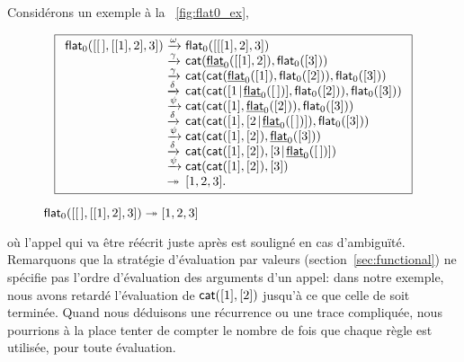 Considérons un exemple à la \fig~\vref{fig:flat0_ex},
\begin{figure}[!b]
\begin{equation*}
\boxed{%
\begin{array}{r@{\;}l@{\;}l}
\fun{flat}_0([\el,[[1],2],3])
& \xrightarrow{\smash{\omega}}
& \fun{flat}_0([[[1],2],3])\\
& \xrightarrow{\smash{\gamma}}
& \fun{cat}(\ufun{flat}_0([[1],2]),\fun{flat}_0([3]))\\
& \xrightarrow{\smash{\gamma}}
& \fun{cat}(\fun{cat}(\ufun{flat}_0([1]),\fun{flat}_0([2])),\fun{flat}_0([3]))\\
& \xrightarrow{\smash{\delta}}
& \fun{cat}(\fun{cat}(\cons{1}{\ufun{flat}_0(\el)},\fun{flat}_0([2])),\fun{flat}_0([3]))\\
& \xrightarrow{\smash{\psi}}
& \fun{cat}(\fun{cat}([1],\ufun{flat}_0([2])),\fun{flat}_0([3]))\\
& \xrightarrow{\smash{\delta}}
& \fun{cat}(\fun{cat}([1],\cons{2}{\ufun{flat}_0(\el)}),\fun{flat}_0([3]))\\
& \xrightarrow{\smash{\psi}}
& \fun{cat}(\fun{cat}([1],[2]),\ufun{flat}_0([3]))\\
& \xrightarrow{\smash{\delta}}
& \fun{cat}(\fun{cat}([1],[2]),\cons{3}{\ufun{flat}_0(\el)})\\
& \xrightarrow{\smash{\psi}}
& \fun{cat}(\fun{cat}([1],[2]),[3])\\
& \twoheadrightarrow & [1,2,3].
\end{array}
}
\end{equation*}
\caption{\(\textsf{flat}_0([[\,],[[1],2],3]) \twoheadrightarrow [1,2,3]\)}
\label{fig:flat0_ex}
\end{figure}
où l'appel qui va être réécrit juste après est souligné en cas
d'ambiguïté. Remarquons que la stratégie d'évaluation par
valeurs
(section~\ref{sec:functional}) ne spécifie pas l'ordre d'évaluation
des arguments d'un appel: dans notre exemple, nous avons retardé
l'évaluation de \(\textsf{cat}([1],[2])\) 
jusqu'à ce que celle de
 soit terminée. Quand
nous déduisons une récurrence ou une trace compliquée, nous pourrions
à la place tenter de compter le nombre de fois que chaque règle est
utilisée, pour toute évaluation.

